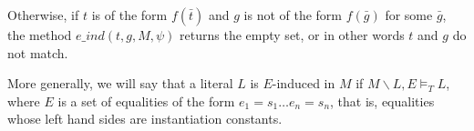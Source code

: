 \documentclass{llncs}
\begin{document}
Otherwise, if $t$ is of the form $f(\bar{t})$ and $g$ is not of the form $f( \bar{g})$ for some $\bar{g}$, the method $e\_ind(t,g,M, \psi)$ returns the empty set, or in other words $t$ and $g$ do not match.

\begin{comment}
\begin{lemma}
\label{lem:e-ind}
For each $E \in e\_ind(t,g,M,\psi)$, we have that $M \backslash t = g, E \models_T t = g$
\end{lemma}
\begin{proof}
The proof is by induction on the structure of $t$, with the induction hypothesis $M \backslash t = g, E \models_T t = g$.
If $t$ is an instantiation constant, then clearly $M \backslash t = g, t = rep( g ) \models_T t = g$.

Otherwise, the only other relevant case to consider is when $t$ is of the form $f( \bar{t_a} )$ and $g$ is of the form $f( \bar{ g_a } )$ (for all other cases, $e\_ind$ returns the empty set).
By congruence, it suffices to show for each $E$ in the constructed set $S$, we have that all the arguments of $t$ and $g$ are $E$-induced in $M$, or in other words $M \backslash t = g, E \models_T t_1 = g_1 \wedge \ldots \wedge t_n = g_n$.

Say we have constructed a set of equality sets $S_{i-1}$ such that $M \backslash t = g, E \models t_1 = g_1 \wedge \ldots \wedge t_{i-1} = g_{i-1}$ for each $E \in S_{i-1}$.
Our goal is to show that $e\_ind$ constructs an $S_i$ on the $i^{th}$ iteration such that for each $E \in S_i$, $M \backslash t = g, E \models_T t_1 = g_1 \wedge \ldots \wedge t_{i-1} = g_{i-1} \wedge t_i = g_i$.
In the case that $M \models_T t_i = g_i$, then $S_i$ is equal to $S_{i-1}$ and the statement holds immediately.
In the case that $M \not\models_T t_i = g_i$, then we may construct a set $S'$. 
Note that by our induction hypothesis, $M \backslash t_i = g_i, E \models_T t_i = g_i$ for each $E \in S'$.
We take $S_i$ to be the merge of $S_{i-1}$ and $S'$.
Since each $E \in S_i$ contains all equalities from some $E_1 \in S_{i-1}$ and some $E_2 \in S'$, we have that $M \backslash t = g, E \models_T t_1 = g_1 \wedge \ldots \wedge t_{i-1} = g_{i-1} \wedge t_i = g_i$ for each $E \in S_i$. $\Box$
\end{proof}
\end{comment}

More generally, we will say that a literal $L$ is $E$-induced in $M$ if $M \backslash L, E \models_T L$, where $E$ is a set of equalities of the form $e_1 = s_1 \ldots e_n = s_n$, that is, equalities whose left hand sides are instantiation constants.
\end{document}
